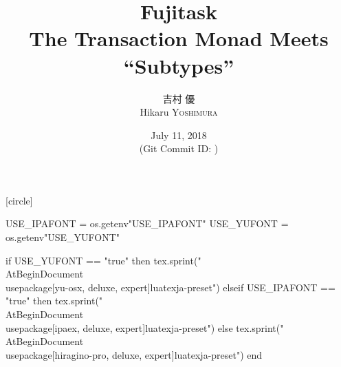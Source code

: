 \hypersetup{colorlinks,linkcolor=,urlcolor=links}

\beamertemplatenavigationsymbolsempty

[circle]

\usepackage{luacode}
\usepackage{luatexja}
\usepackage{pgfpages}
\usepackage{fontspec}

\begin{luacode*}
  USE_IPAFONT = os.getenv"USE_IPAFONT"
  USE_YUFONT = os.getenv"USE_YUFONT"
  
  if USE_YUFONT == "true" then
    tex.sprint("\\AtBeginDocument{\\usepackage[yu-osx, deluxe, expert]{luatexja-preset}}")
  elseif USE_IPAFONT == "true" then
    tex.sprint("\\AtBeginDocument{\\usepackage[ipaex, deluxe, expert]{luatexja-preset}}")
  else
    tex.sprint("\\AtBeginDocument{\\usepackage[hiragino-pro, deluxe, expert]{luatexja-preset}}")
  end
\end{luacode*}

\usepackage{epigraph}
\usepackage{etoolbox}
\usepackage{tikz}
\usepackage{framed}
\usepackage[ss]{libertine}
\usepackage{amsmath}
\usepackage{mathtools}
\usepackage{listings}
\usepackage{caption}
\usepackage{tikz-qtree}

\renewcommand{\kanjifamilydefault}{\gtdefault}



\setmonofont[Ligatures=TeX]{CMU Typewriter Text}



\newcommand{\Fujitask}{{\rmfamily\bfseries Fujitask}}

\title[Fujitask]{%
  \bfseries\rmfamily\mcfamily
  Fujitask \\
  {\footnotesize The Transaction Monad Meets ``Subtypes''}
}
\author[吉村 優]{%
  吉村 優 \\
  Hikaru \textsc{Yoshimura}
}
\date[July 11, 2018]{%
   July 11, 2018 \\%
  {\footnotesize (Git Commit ID: \href{https://github.com/y-yu/fujitask-slide}{\GITAbrHash})}
}

